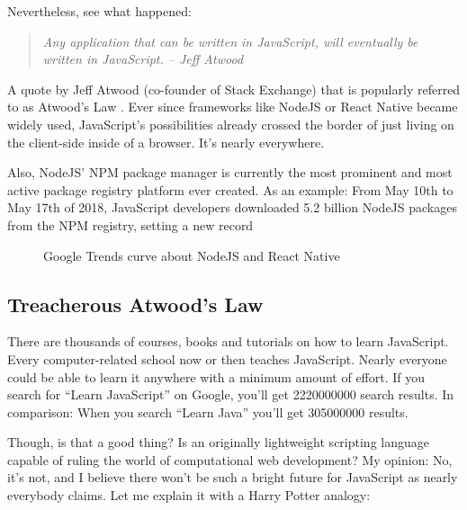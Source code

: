 \documentclass[10pt]{article}  %
\begin{document}
\begin{sloppypar}
  Nevertheless, see what happened:

  \begin{quote}
    \emph{Any application that can be written in JavaScript, will eventually be written in JavaScript. – Jeff Atwood}
  \end{quote}

  A quote by Jeff Atwood (co-founder of Stack Exchange) that is popularly referred to as Atwood’s Law \citep{atwood_principle_2007}. Ever since frameworks like NodeJS or React Native became widely used, JavaScript’s possibilities already crossed the border of just living on the client-side inside of a browser. It’s nearly everywhere.

  Also, NodeJS’ NPM package manager is currently the most prominent and most active package registry platform ever created. As an example: From May 10th to May 17th of 2018, JavaScript developers downloaded 5.2 billion NodeJS packages from the NPM registry, setting a new record \citep{inc_how_2018}

  \begin{figure}[ht]
    \centering
    \caption{Google Trends curve about NodeJS and React Native}
    \label{fig:atwood-law}
  \end{figure}

  \subsection{Treacherous Atwood’s Law}
  \label{sec:atwood-law}

  There are thousands of courses, books and tutorials on how to learn JavaScript. Every computer-related school now or then teaches JavaScript. Nearly everyone could be able to learn it anywhere with a minimum amount of effort. If you search for “Learn JavaScript” on Google, you’ll get \num{2220000000} search results. In comparison: When you search “Learn Java” you’ll get \num{305000000} results.

  Though, is that a good thing? Is an originally lightweight scripting language capable of ruling the world of computational web development? My opinion: No, it’s not, and I believe there won’t be such a bright future for JavaScript as nearly everybody claims. Let me explain it with a Harry Potter analogy:


\end{sloppypar}
\end{document}
